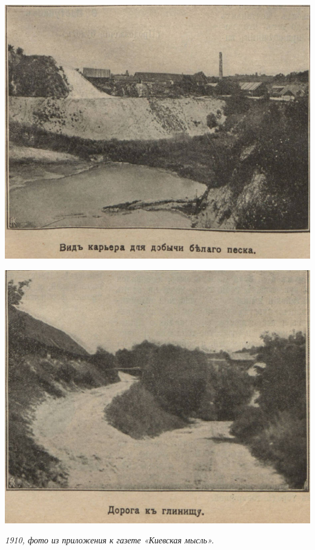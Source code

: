 \begin{center}
\includegraphics[width=0.91\linewidth]{pix/1910-03.jpg}
\end{center} 


\begin{center}
\includegraphics[width=0.91\linewidth]{pix/1910-04.jpg}

\textit{1910, фото из приложения к газете «Киевская мысль».}
\end{center} 


